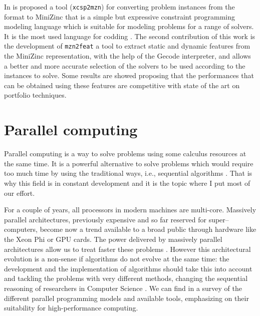 In \cite{Amadini} is proposed a tool (\texttt{xcsp2mzn}) for converting problem instances from the format  \cite{Committee} to {\sc MiniZinc} that is a simple but expressive constraint programming modeling language which is suitable for modeling problems for a range of solvers. It is the most used language for codding \csps{} \cite{Nethercote}. The second contribution of this work is the development of \texttt{mzn2feat} a tool to extract static and dynamic features from the {\sc MiniZinc} representation, with the help of the {\sc Gecode} interpreter, and allows a better and more accurate selection of the solvers to be used according to the instances to solve. Some results are showed proposing that the performances that can be obtained using these features are competitive with state of the art on \csp{} portfolio techniques. 


\section{Parallel computing}
\label{sec:parallel}

Parallel computing is a way to solve problems using some calculus resources at the same time. It is a powerful alternative to solve problems which would require too much time by using the traditional ways, i.e., sequential algorithms \cite{Grama2003}. That is why this field is in constant development and it is the topic where I put most of our effort. 

For a couple of years, all processors in modern machines are multi-core. Massively parallel architectures, previously expensive and so far reserved for super--computers, become now a trend available to a broad public through hardware like the Xeon Phi or GPU cards. The power delivered by massively parallel architectures allow us to treat faster these problems \cite{Borkar2007}. However this architectural evolution is a non-sense if algorithms do not evolve at the same time: the development and the implementation of algorithms should take this into account and tackling the problems with very different methods, changing the sequential reasoning of researchers in Computer Science \cite{Hill2008, Sanders2014}. We can find in \cite{Diaz2012} a survey of the different parallel programming models and available tools, emphasizing on their suitability for high-performance computing.


